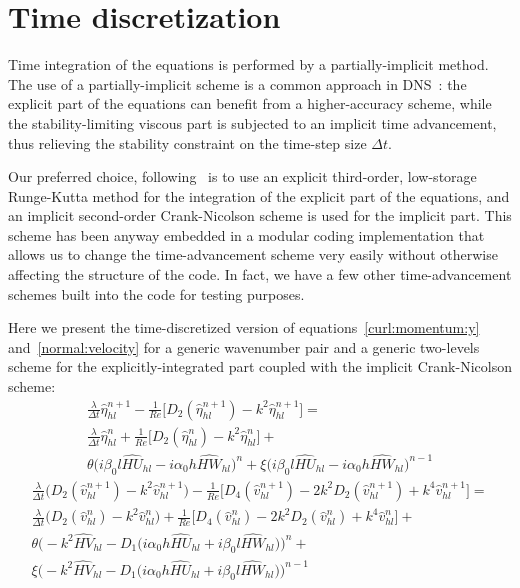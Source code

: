




\section{Time discretization}
Time integration of the equations is performed by a partially-implicit method.
The use of a partially-implicit scheme is a common approach in DNS~\cite{kim_moin_moser}: the explicit part of the equations can benefit from a higher-accuracy scheme, while the stability-limiting viscous part is subjected to an implicit time advancement, thus relieving the stability constraint on the time-step size $	\Delta t$. \par
Our preferred choice, following~\cite{cpl:presentazione}\cite{kim_moin_moser} is to use an explicit third-order, low-storage Runge-Kutta method for the integration of the explicit part of the equations, and an implicit second-order Crank-Nicolson scheme is used for the implicit part. This scheme has been anyway embedded in a modular coding implementation that allows us to change the time-advancement scheme very easily without otherwise affecting the structure of the code. In fact, we have a few other time-advancement schemes built into the code for testing purposes. \par
 Here we present the time-discretized version of equations~\ref{curl:momentum:y} and~\ref{normal:velocity} for a generic wavenumber pair and a generic two-levels scheme for the explicitly-integrated part coupled with the implicit Crank-Nicolson scheme:
\begin{multline}
\frac{\lambda}{\Delta t} \hat{\eta}_{hl}^{n+1} -\frac{1}{Re} \big[ D_{2} (\hat{\eta}_{hl}^{n+1}) - k^{2} \hat{\eta}_{hl}^{n+1} \big] = \\
\frac{\lambda}{\Delta t} \hat{\eta}_{hl}^{n} + \frac{1}{Re} \big[ D_{2} (\hat{\eta}_{hl}^{n}) - k^{2} \hat{\eta}_{hl}^{n} \big] + \\
\theta \bigg( i\beta_{0}l\widehat{HU}_{hl} - i\alpha_{0}h\widehat{HW}_{hl} \bigg)^{n} + \xi \bigg( i\beta_{0}l\widehat{HU}_{hl} - i\alpha_{0}h \widehat{HW}_{hl} \bigg)^{n-1}
\end{multline}
\begin{multline}
\frac{\lambda}{\Delta t} \big( D_{2} (\hat{v}_{hl}^{n+1}) - k^{2} \hat{v}_{hl}^{n+1} \big) -\frac{1}{Re} \big[ D_{4} (\hat{v}_{hl}^{n+1}) -2 k^{2} D_{2} (\hat{v}_{hl}^{n+1}) + k^{4} \hat{v}_{hl}^{n+1} \big] =\\
\frac{\lambda}{\Delta t} \big( D_{2}(\hat{v}_{hl}^{n}) - k^{2}\hat{v}_{hl}^{n} \big) + \frac{1}{Re} \big[ D_{4} (\hat{v}_{hl}^{n}) -2 k^{2} D_{2} (\hat{v}_{hl}^{n}) + k^{4} \hat{v}_{hl}^{n} \big]+ \\
\theta \bigg( -k^{2} \widehat{HV}_{hl} -D_{1} \big( i\alpha_{0} h \widehat{HU}_{hl} + i\beta_{0} l \widehat{HW}_{hl} \big)  \bigg)^{n} + \\
\xi \bigg( -k^{2} \widehat{HV}_{hl} -D_{1} \big( i\alpha_{0}h\widehat{HU}_{hl} + i\beta_{0}l \widehat{HW}_{hl} \big) \bigg)^{n-1}
\end{multline}


